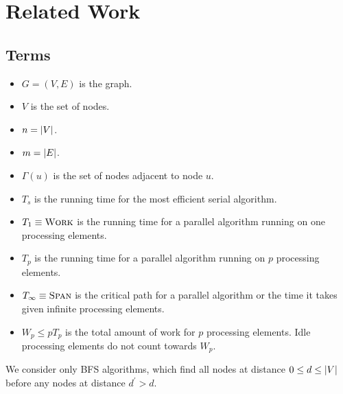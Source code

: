 \section{Related Work}

\subsection{Terms}
\begin{itemize}
    \item $G=(V,E)$ is the graph.
    \item $V$ is the set of nodes.
    \item $n=\left|V\right|$.
    \item $m=\left|E\right|$.
    \item $\Gamma(u)$ is the set of nodes adjacent to node $u$.
    \item $T_s$ is the running time for the most efficient serial algorithm.
    \item $T_1 \equiv \relax{\textrm{\bf{\sc{Work}}}}$ is the running time for a parallel algorithm running on one processing elements.
    \item $T_p$ is the running time for a parallel algorithm running on $p$ processing elements.
    \item $T_\infty \equiv \relax{\textrm{\bf{\sc{Span}}}}$ is the critical path for a parallel algorithm or the time it takes given infinite processing elements.
    \item $W_p \leq pT_p$ is the total amount of work for $p$ processing elements.  Idle processing elements do not count towards $W_p$.
\end{itemize}


We consider only  BFS algorithms, which find all nodes at distance $0\leq d \leq \left|V\right|$ before any nodes at distance $d^\prime > d$.


